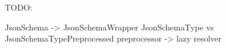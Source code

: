 TODO:

JsonSchema -> JsonSchemaWrapper %
JsonSchemaType vs JsonSchemaTypePreprocessed
preprocessor -> lazy resolver